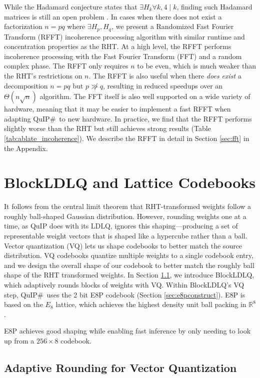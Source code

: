 While the Hadamard conjecture states that $\exists H_k \forall k, 4 \mid k$, finding such Hadamard matrices is still an open problem \cite{hadconj}. In cases when there does not exist a factorization $n=pq$ where $\exists H_p, H_q$, we present a Randomized Fast Fourier Transform (RFFT) incoherence processing algorithm with similar runtime and concentration properties as the RHT. At a high level, the RFFT performs incoherence processing with the Fast Fourier Transform (FFT) \cite{fft} and a random complex phase. The RFFT only requires $n$ to be even, which is much weaker than the RHT's restrictions on $n$. The RFFT is also useful when there \textit{does exist} a decomposition $n=pq$ but $p \not \gg q$, resulting in reduced speedups over an $\Theta(n\sqrt{n})$ algorithm. The FFT itself is also well supported on a wide variety of hardware, meaning that it may be easier to implement a fast RFFT when adapting QuIP$\#$\  to new hardware. In practice, we find that the RFFT performs slightly worse than the RHT but still achieves strong results (Table \ref{tab:ablate_incoherence}).
We describe the RFFT in detail in Section \ref{sec:fft} in the Appendix.

\section{BlockLDLQ and Lattice Codebooks}
\label{sec:blockround}
It follows from the central limit theorem that RHT-transformed weights follow a roughly ball-shaped Gaussian distribution. However, rounding weights one at a time, as QuIP does with its LDLQ, ignores this shaping---producing a set of representable weight vectors that is shaped like a hypercube rather than a ball. Vector quantization (VQ) lets us shape codebooks to better match the source distribution. VQ codebooks quantize multiple weights to a single codebook entry, and we design the overall shape of our codebook to better match the roughly ball shape of the RHT transformed weights. In Section \ref{sec:blockldlq}, we introduce BlockLDLQ, which adaptively rounds blocks of weights with VQ. Within BlockLDLQ's VQ step, QuIP$\#$\  uses the 2 bit E8P codebook (Section \ref{sec:e8pconstruct}).
E8P is based on the $E_8$ lattice, which achieves the highest density unit ball packing in $\mathbb{R}^8$ \cite{maryna}.

E8P achieves good shaping while enabling fast inference by only needing to look up from a $256\times 8$ codebook. 

\subsection{Adaptive Rounding for Vector Quantization}
\label{sec:blockldlq}


